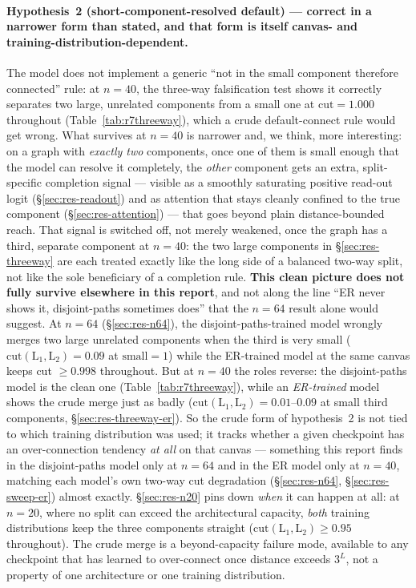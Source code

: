 \documentclass[11pt,a4paper]{article}
\begin{document}
\paragraph{Hypothesis~2 (short-component-resolved default) --- correct in a
narrower form than stated, and that form is itself canvas- and
training-distribution-dependent.} The model does not implement a generic ``not
in the small component therefore connected'' rule: at $n=40$, the three-way
falsification test shows it correctly separates two large, unrelated
components from a small one at $\mathrm{cut}=1.000$ throughout
(Table~\ref{tab:r7threeway}), which a crude default-connect rule would get
wrong. What survives at $n=40$ is narrower and, we think, more interesting: on
a graph with \emph{exactly two} components, once one of them is small enough
that the model can resolve it completely, the \emph{other} component gets an
extra, split-specific completion signal --- visible as a smoothly saturating
positive read-out logit (\S\ref{sec:res-readout}) and as attention that stays
cleanly confined to the true component (\S\ref{sec:res-attention}) --- that
goes beyond plain distance-bounded reach. That signal is switched off, not
merely weakened, once the graph has a third, separate component at $n=40$: the
two large components in \S\ref{sec:res-threeway} are each treated exactly like
the long side of a balanced two-way split, not like the sole beneficiary of a
completion rule. \textbf{This clean picture does not fully survive elsewhere in this report}, and not along the
line ``ER never shows it, disjoint-paths sometimes does'' that the $n=64$ result alone would
suggest. At $n=64$ (\S\ref{sec:res-n64}), the disjoint-paths-trained model wrongly merges two
large unrelated components when the third is very small
($\mathrm{cut}(\mathrm{L}_1,\mathrm{L}_2)=0.09$ at $\mathrm{small}=1$) while the ER-trained
model at the same canvas keeps cut $\ge0.998$ throughout. But at $n=40$ the roles reverse: the
disjoint-paths model is the clean one (Table~\ref{tab:r7threeway}), while an \emph{ER-trained}
model shows the crude merge just as badly ($\mathrm{cut}(\mathrm{L}_1,\mathrm{L}_2)=0.01$--$0.09$
at small third components, \S\ref{sec:res-threeway-er}). So the crude form of hypothesis~2 is
not tied to which training distribution was used; it tracks whether a given checkpoint has an
over-connection tendency \emph{at all} on that canvas --- something this report finds in the
disjoint-paths model only at $n=64$ and in the ER model only at $n=40$, matching each model's
own two-way cut degradation (\S\ref{sec:res-n64}, \S\ref{sec:res-sweep-er}) almost exactly.
\S\ref{sec:res-n20} pins down \emph{when} it can happen at all: at $n=20$, where no split can
exceed the architectural capacity, \emph{both} training distributions keep the three components
straight ($\mathrm{cut}(\mathrm{L}_1,\mathrm{L}_2)\ge0.95$ throughout). The crude merge is a
beyond-capacity failure mode, available to any checkpoint that has learned to over-connect once
distance exceeds $3^L$, not a property of one architecture or one training distribution.
\end{document}
